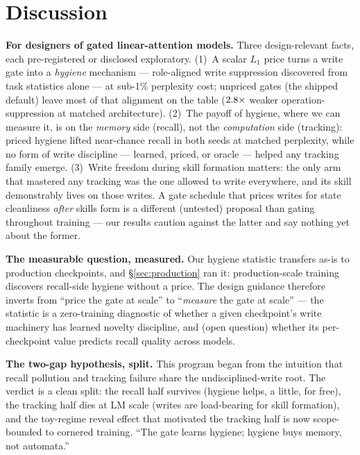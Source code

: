 \documentclass[10pt]{article}
\begin{document}
\section{Discussion}\label{sec:discussion}
\textbf{For designers of gated linear-attention models.} Three design-relevant facts, each
pre-registered or disclosed exploratory. (1)~A scalar $L_1$ price turns a write gate into a
\emph{hygiene} mechanism --- role-aligned write suppression discovered from task statistics alone
--- at sub-1\% perplexity cost; unpriced gates (the shipped default) leave most of that alignment
on the table ($2.8\times$ weaker operation-suppression at matched architecture).
(2)~The payoff of hygiene, where we can measure it, is on the \emph{memory} side (recall), not the
\emph{computation} side (tracking): priced hygiene lifted near-chance recall in both seeds at
matched perplexity, while no form of write discipline --- learned, priced, or oracle --- helped any
tracking family emerge. (3)~Write freedom during skill formation matters: the only arm that
mastered any tracking was the one allowed to write everywhere, and its skill demonstrably lives on
those writes. A gate schedule that prices writes for state cleanliness \emph{after} skills form is
a different (untested) proposal than gating throughout training --- our results caution against the
latter and say nothing yet about the former.

\textbf{The measurable question, measured.} Our hygiene statistic transfers as-is to production
checkpoints, and \S\ref{sec:production} ran it: production-scale training discovers recall-side
hygiene without a price. The design guidance therefore inverts from ``price the gate at scale'' to
``\emph{measure} the gate at scale'' --- the statistic is a zero-training diagnostic of whether a
given checkpoint's write machinery has learned novelty discipline, and (open question) whether its
per-checkpoint value predicts recall quality across models.

\textbf{The two-gap hypothesis, split.} This program began from the intuition that recall pollution
and tracking failure share the undisciplined-write root. The verdict is a clean split: the recall
half survives (hygiene helps, a little, for free), the tracking half dies at LM scale (writes are
load-bearing for skill formation), and the toy-regime reveal effect that motivated the tracking
half is now scope-bounded to cornered training. ``The gate learns hygiene; hygiene buys memory,
not automata.''
\end{document}
